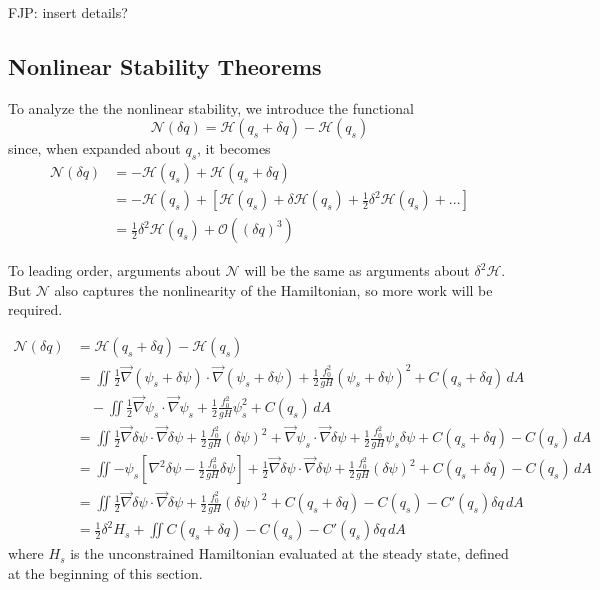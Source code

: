 \documentclass[12pt]{article}
\begin{document}
FJP: insert details?

\subsection{Nonlinear Stability Theorems}

To analyze the the nonlinear stability, we introduce the functional
$$
\mathcal{N}(\delta q)  = \mathcal{H}(q_s + \delta q) - \mathcal{H}(q_s)
$$
since, when expanded about $q_s$, it becomes
\begin{align*}
\mathcal{N}(\delta q) 
&= - \mathcal{H}(q_s) + \mathcal{H}(q_s + \delta q) \\
& = - \mathcal{H}(q_s) + \left[ \mathcal{H}(q_s) + \delta \mathcal{H}(q_s)+ \frac12 \delta^2 \mathcal{H}(q_s) + ... \right] \\
&= \frac12 \delta^2 \mathcal{H}(q_s) + \mathcal{O}((\delta q)^3)
\end{align*}

To leading order, arguments about $\mathcal{N}$ will be the same as arguments about $\delta^2 \mathcal{H}$. But $\mathcal{N}$ also captures the nonlinearity of the Hamiltonian, so more work will be required.

\begin{align*}
\mathcal{N}(\delta q) 
& = \mathcal{H}(q_s + \delta q) - \mathcal{H}(q_s) \\
&= \iint  \frac12 \vec\nabla(\psi_s + \delta \psi) \cdot \vec\nabla(\psi_s + \delta \psi) + \frac12 \frac{f_0^2}{g H} (\psi_s + \delta \psi)^2 + C(q_s + \delta q) \, dA \\
 & \quad - \iint  \frac12 \vec\nabla\psi_s \cdot \vec\nabla\psi_s + \frac12 \frac{f_0^2}{g H} \psi_s^2 + C(q_s) \, dA \\
&= \iint \frac12 \vec\nabla\delta\psi \cdot \vec\nabla\delta\psi + \frac12 \frac{f_0^2}{g H} (\delta \psi)^2 + \vec\nabla\psi_s \cdot \vec\nabla\delta\psi + \frac12 \frac{f_0^2}{g H} \psi_s\delta\psi + C(q_s + \delta q) - C(q_s) \, dA \\
&= \iint -\psi_s \left[ \nabla^2\delta\psi - \frac12 \frac{f_0^2}{g H} \delta\psi \right] + \frac12 \vec\nabla\delta\psi \cdot \vec\nabla\delta\psi + \frac12 \frac{f_0^2}{g H}(\delta\psi)^2 + C(q_s + \delta q) - C(q_s) \, dA \\
&= \iint \frac12 \vec\nabla\delta\psi \cdot \vec\nabla\delta\psi + \frac12 \frac{f_0^2}{g H}(\delta \psi)^2 + C(q_s + \delta q) - C(q_s) -C'(q_s)\delta q\, dA \\
&= \frac12 \delta^2 H_s + \iint C(q_s + \delta q) - C(q_s) -C'(q_s)\delta q\, dA
\end{align*}
where $H_s$ is the unconstrained Hamiltonian evaluated at the steady state, defined at the beginning of this section.
\end{document}
